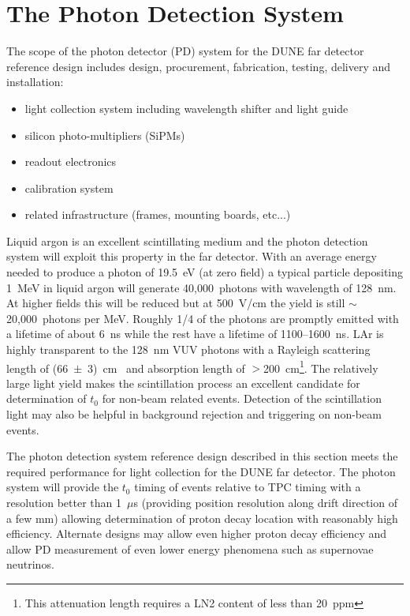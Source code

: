 \section{The Photon Detection System}
\label{sec:detectors-fd-ref-pd}

The scope of the photon detector (PD) system for the DUNE far detector
reference design includes design, procurement, fabrication,
testing, delivery and installation:
\begin{itemize}
\item light collection system including wavelength shifter and light guide
\item silicon photo-multipliers (SiPMs)
\item readout electronics
\item calibration system
\item related infrastructure (frames, mounting boards, etc...)
\end{itemize}

Liquid argon is an excellent scintillating medium and the photon
detection system will exploit this property in the far detector.  With
an average energy needed to produce a photon of 19.5~eV (at zero
field) a typical particle depositing 1~MeV in liquid argon will
generate 40,000~photons with wavelength of 128~nm. At higher fields
this will be reduced but at 500~V/cm the yield is still
$\sim$20,000~photons per MeV. Roughly 1/4 of the photons are promptly
emitted with a lifetime of about 6~ns while the rest have a lifetime
of 1100--1600~ns. LAr is highly transparent to the 128~nm VUV photons
with a Rayleigh scattering length of (66~$\pm$~3)~cm~\cite{Rayleigh}
and absorption length of $>$200~cm\footnote{This attenuation length
  requires a LN2 content of less than 20~ppm}. The relatively large light yield
makes the scintillation process an excellent candidate for
determination of $t_0$ for non-beam related events. Detection of the
scintillation light may also be helpful in background rejection and
triggering on non-beam events.

The photon detection system reference design described in this section
meets the required performance for light collection for the DUNE far
detector. The photon system will provide the $t_0$ timing of events
relative to TPC timing with a resolution better than 1~$\mu$s
(providing position resolution along drift direction of a few mm)
allowing determination of proton decay location with reasonably high
efficiency.  Alternate designs may allow even higher proton decay
efficiency and allow PD measurement of even lower energy phenomena
such as supernovae neutrinos.

